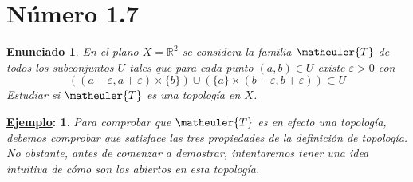 \documentclass[10pt,a4paper,openright]{book}
\theoremstyle{break}
\newtheorem*{enun}{Enunciado}
\newtheorem*{ej}{\underline{Ejemplo}:}
\begin{document}
\section{Número 1.7}
\begin{enun}
En el plano $X = \mathbb{R}^2$ se considera la familia $\matheuler{T}$ de todos los subconjuntos $U$ tales que para cada punto $(a,b) \in U$ existe $\varepsilon > 0$ con 
$$((a - \varepsilon, a + \varepsilon) \times \{b\}) \cup (\{a\} \times (b-\varepsilon, b + \varepsilon)) \subset U$$
Estudiar si $\matheuler{T}$  es una topología en $X$.
\end{enun}
\begin{ej}
Para comprobar que $\matheuler{T}$ es en efecto una topología, debemos comprobar que satisface las tres propiedades de la definición de topología. No obstante, antes de comenzar a demostrar, intentaremos tener una idea intuitiva de cómo son los abiertos en esta topología.
\begin{figure}[h]

\begin{tikzpicture}[x=0.75pt,y=0.75pt,yscale=-1,xscale=1]


\end{tikzpicture}
\end{figure}
\end{ej}
\end{document}
